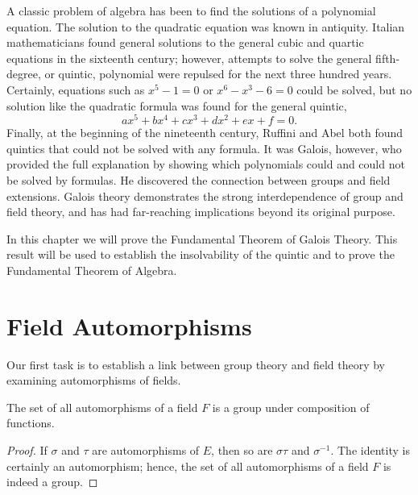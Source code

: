  
 
A classic problem of algebra has been to find the solutions of a polynomial equation.  The solution to the quadratic equation was known in antiquity.  Italian mathematicians found general solutions to the
general cubic and quartic equations in the sixteenth century; however,  attempts to solve the general fifth-degree, or quintic, polynomial were repulsed for the next three hundred years. Certainly, equations such as $x^5 - 1 = 0$ or $x^6 - x^3 - 6 = 0$ could be solved, but no solution like the quadratic formula was found for the general quintic, 
\[
a x^5 + b x^4 +c x^3 + d x^2 + e x + f = 0.
\]
Finally, at the beginning of the nineteenth century, Ruffini and Abel both found quintics that could not be solved with any formula.  It was Galois, however, who provided the full explanation by showing which
polynomials could and could not be solved by formulas.  He discovered the connection between groups and field extensions.  Galois theory demonstrates the strong interdependence of group and field theory, and has had far-reaching implications beyond its original purpose.  
 
In this chapter we will prove the Fundamental Theorem of Galois Theory.  This result will be used to establish the insolvability of the quintic and to prove the Fundamental Theorem of Algebra. 


\section{Field Automorphisms}
 
Our first task is to establish a link between group theory and field theory by examining automorphisms of fields.
 
\begin{proposition}
The set of all automorphisms of a field $F$ is a group under composition of functions.
\end{proposition}
 
\begin{proof}
If $\sigma$ and $\tau$ are automorphisms of $E$, then so are $\sigma \tau$ and $\sigma^{-1}$.  The identity is certainly an automorphism; hence, the set of all automorphisms of a field $F$ is indeed a group.
\end{proof}

